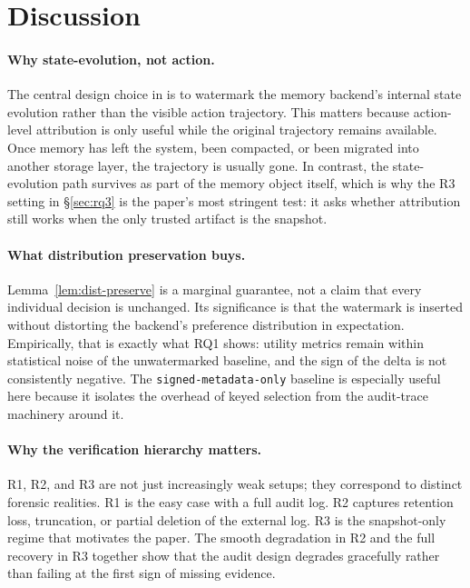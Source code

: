 \section{Discussion}
\label{sec:discuss}

\paragraph{Why state-evolution, not action.}
The central design choice in \memmark{} is to watermark the memory
backend's internal state evolution rather than the visible action
trajectory. This matters because action-level attribution is only useful
while the original trajectory remains available. Once memory has left
the system, been compacted, or been migrated into another storage
layer, the trajectory is usually gone. In contrast, the state-evolution
path survives as part of the memory object itself, which is why the R3
setting in \S\ref{sec:rq3} is the paper's most stringent test: it asks
whether attribution still works when the only trusted artifact is the
snapshot.

\paragraph{What distribution preservation buys.}
Lemma~\ref{lem:dist-preserve} is a marginal guarantee, not a claim that
every individual decision is unchanged. Its significance is that the
watermark is inserted without distorting the backend's preference
distribution in expectation. Empirically, that is exactly what RQ1
shows: utility metrics remain within statistical noise of the
unwatermarked baseline, and the sign of the delta is not consistently
negative. The \texttt{signed-metadata-only} baseline is especially
useful here because it isolates the overhead of keyed selection from the
audit-trace machinery around it.

\paragraph{Why the verification hierarchy matters.}
R1, R2, and R3 are not just increasingly weak setups; they correspond
to distinct forensic realities. R1 is the easy case with a full audit
log. R2 captures retention loss, truncation, or partial deletion of the
external log. R3 is the snapshot-only regime that motivates the paper.
The smooth degradation in R2 and the full recovery in R3 together show
that the audit design degrades gracefully rather than failing at the
first sign of missing evidence.

